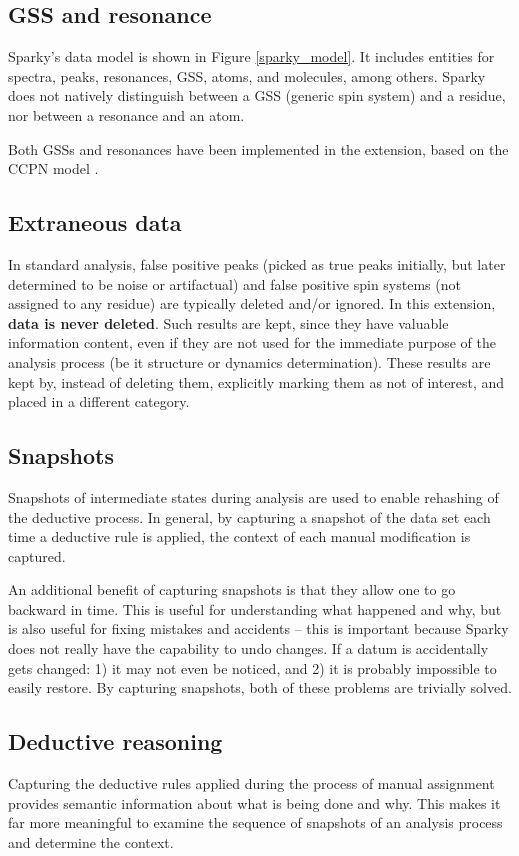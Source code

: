 \subsection*{GSS and resonance}
Sparky's data model is shown in Figure \ref{sparky_model}.  It includes 
entities for spectra, peaks, resonances, GSS, atoms, and molecules, among
others.  Sparky does not natively distinguish between a GSS (generic spin 
system) and a residue, nor between a resonance and an atom.

Both GSSs and resonances have been implemented in the extension, based 
on the CCPN model \cite{ccpn}.

\subsection*{Extraneous data}
In standard analysis, false positive peaks (picked as true peaks initially,
but later determined to be noise or artifactual) and false positive spin 
systems (not assigned to any residue) are typically deleted and/or ignored.
In this extension, \textbf{data is never deleted}.  Such results are kept,
since they have valuable information content, even if they are not used for
the immediate purpose of the analysis process (be it structure or dynamics
determination).  These results are kept by, instead of deleting them, 
explicitly marking them as not of interest, and placed in a different
category.

\subsection*{Snapshots}
Snapshots of intermediate states during analysis are used to enable rehashing
of the deductive process.  In general, by capturing a snapshot of the data set
each time a deductive rule is applied, the context of each manual modification
is captured.

An additional benefit of capturing snapshots is that they allow one to go 
backward in time.  This is useful for understanding what happened and
why, but is also useful for fixing mistakes and accidents -- this is
important because Sparky does not really have the capability to undo
changes.  If a datum is accidentally gets changed: 1) it may not even
be noticed, and 2) it is probably impossible to easily restore.  By capturing
snapshots, both of these problems are trivially solved.

\subsection*{Deductive reasoning}
Capturing the deductive rules applied during the process of manual assignment
provides semantic information about what is being done and why.  This makes it
far more meaningful to examine the sequence of snapshots of an analysis
process and determine the context.



